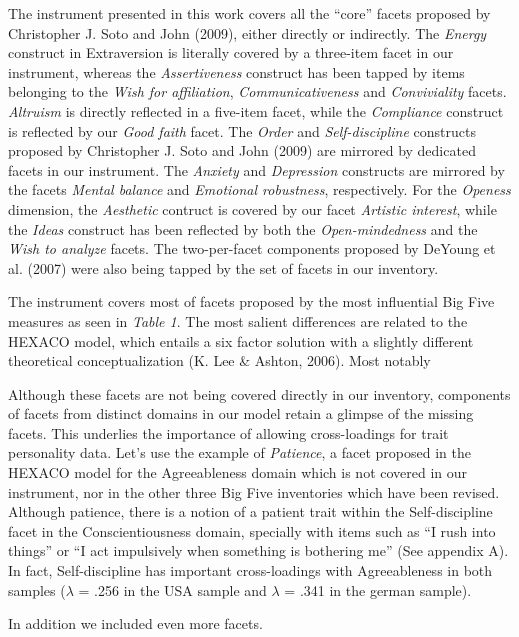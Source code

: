 \documentclass[,man,floatsintext]{apa6}
\begin{document}
The instrument presented in this work covers all the \enquote{core}
facets proposed by Christopher J. Soto and John (2009), either directly
or indirectly. The \emph{Energy} construct in Extraversion is literally
covered by a three-item facet in our instrument, whereas the
\emph{Assertiveness} construct has been tapped by items belonging to the
\emph{Wish for affiliation}, \emph{Communicativeness} and
\emph{Conviviality} facets. \emph{Altruism} is directly reflected in a
five-item facet, while the \emph{Compliance} construct is reflected by
our \emph{Good faith} facet. The \emph{Order} and \emph{Self-discipline}
constructs proposed by Christopher J. Soto and John (2009) are mirrored
by dedicated facets in our instrument. The \emph{Anxiety} and
\emph{Depression} constructs are mirrored by the facets \emph{Mental
balance} and \emph{Emotional robustness}, respectively. For the
\emph{Openess} dimension, the \emph{Aesthetic} contruct is covered by
our facet \emph{Artistic interest}, while the \emph{Ideas} construct has
been reflected by both the \emph{Open-mindedness} and the \emph{Wish to
analyze} facets. The two-per-facet components proposed by DeYoung et al.
(2007) were also being tapped by the set of facets in our inventory.

The instrument covers most of facets proposed by the most influential
Big Five measures as seen in \emph{Table 1}. The most salient
differences are related to the HEXACO model, which entails a six factor
solution with a slightly different theoretical conceptualization (K. Lee
\& Ashton, 2006). Most notably

Although these facets are not being covered directly in our inventory,
components of facets from distinct domains in our model retain a glimpse
of the missing facets. This underlies the importance of allowing
cross-loadings for trait personality data. Let's use the example of
\emph{Patience}, a facet proposed in the HEXACO model for the
Agreeableness domain which is not covered in our instrument, nor in the
other three Big Five inventories which have been revised. Although
patience, there is a notion of a patient trait within the
Self-discipline facet in the Conscientiousness domain, specially with
items such as \enquote{I rush into things} or \enquote{I act impulsively
when something is bothering me} (See appendix A). In fact,
Self-discipline has important cross-loadings with Agreeableness in both
samples (\(\lambda\) = .256 in the USA sample and \(\lambda\) = .341 in
the german sample).

In addition we included even more facets.
\end{document}
